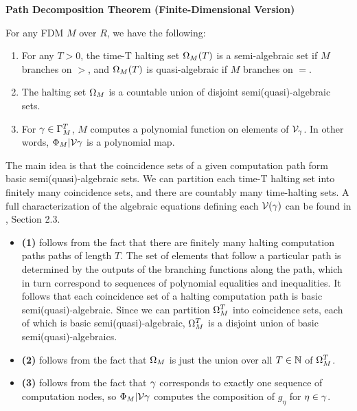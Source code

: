   \begin{theorem}{\textbf{Path Decomposition Theorem (Finite-Dimensional Version)}}
    
    For any FDM $M$ over $R$, we have the following:

    \begin{enumerate}
    \item For any $T > 0$, the time-T halting set $\Omega_M(T)$ is a
      semi-algebraic set if $M$ branches on $>$, and $\Omega_M(T)$ is
      quasi-algebraic if $M$ branches on $=$.

    \item The halting set $\Omega_M$ is a countable union of
      disjoint semi(quasi)-algebraic sets.

    \item For $\gamma \in \Gamma_M^T$, $M$ computes a
      polynomial function on elements of $\mathcal{V}_\gamma$.
      In other words, $\Phi_M|\mathcal{V}{\gamma}$ is a
      polynomial map.
    \end{enumerate}
    
    \label{thm:pdt-finite}
  \end{theorem}

  \begin{proofsketch}
    
    The main idea is that the coincidence sets of a given computation
    path form basic semi(quasi)-algebraic sets.  We can partition each
    time-T halting set into finitely many coincidence sets, and there
    are countably many time-halting sets.  A full characterization of
    the algebraic equations defining each $\mathcal{V}(\gamma)$
    can be found in \cite{B98}, Section 2.3.

    \begin{itemize}
    \item \textbf{(1)} follows from the fact that there are finitely
      many halting computation paths paths of length $T$.  The set of
      elements that follow a particular path is determined by the
      outputs of the branching functions along the path, which in turn
      correspond to sequences of polynomial equalities and
      inequalities.  It follows that each coincidence set of a halting
      computation path is basic semi(quasi)-algebraic. Since we can
      partition $\Omega_M^T$ into coincidence sets, each of which is
      basic semi(quasi)-algebraic, $\Omega_M^T$ is a disjoint union
      of basic semi(quasi)-algebraics.
    \item \textbf{(2)} follows from the fact that $\Omega_M$ is just
      the union over all $T \in \mathbb{N}$ of $\Omega_M^T$.
    \item \textbf{(3)} follows from the fact that $\gamma$
      corresponds to exactly one sequence of computation nodes, so
      $\Phi_M|\mathcal{V}{\gamma}$ computes the
      composition of $g_{\eta}$ for $\eta \in \gamma$.
    \end{itemize}
  \end{proofsketch}
  
